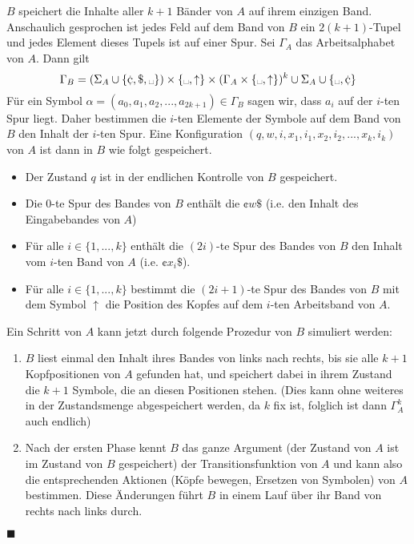         $B$ speichert die Inhalte aller $k+1$ Bänder von $A$ auf ihrem einzigen Band. Anschaulich gesprochen ist jedes Feld auf dem Band von $B$ ein $2(k+1)$-Tupel und jedes Element dieses Tupels ist auf einer Spur. 
        Sei $\Gamma_A$ das Arbeitsalphabet von $A$. Dann gilt 
        $$\Gamma_B = (\Sigma_A \cup \{\cent, \$, \text{\textvisiblespace}\}) \times \{\text{\textvisiblespace},\uparrow\} \times (\Gamma_A \times \{\text{\textvisiblespace}, \uparrow\})^k \cup \Sigma_A \cup \{\text{\textvisiblespace}, \cent\}$$
        Für ein Symbol $\alpha = (a_0,a_1,a_2,...,a_{2k+1}) \in \Gamma_B$ sagen wir, dass $a_i$ auf der $i$-ten Spur liegt. Daher bestimmen die $i$-ten Elemente der Symbole auf dem Band von $B$ den Inhalt der $i$-ten Spur. Eine Konfiguration $(q,w,i,x_1,i_1,x_2,i_2,...,x_k,i_k)$ von $A$ ist dann in $B$ wie folgt gespeichert. 
        \begin{itemize}
            \item Der Zustand $q$ ist in der endlichen Kontrolle von $B$ gespeichert. 
            \item Die $0$-te Spur des Bandes von $B$ enthält die $\cent w\$$ (i.e. den Inhalt des Eingabebandes von $A$)
            \item Für alle $i \in \{1, ..., k\}$ enthält die $(2i)$-te Spur des Bandes von $B$ den Inhalt vom $i$-ten Band von $A$ (i.e. $\cent x_i\$$).
            \item Für alle $i \in \{1, ..., k\}$ bestimmt die $(2i +1)$-te Spur des Bandes von $B$ mit dem Symbol $\uparrow$ die Position des Kopfes auf dem $i$-ten Arbeitsband von $A$.
        \end{itemize}
        Ein Schritt von $A$ kann jetzt durch folgende Prozedur von $B$ simuliert werden:
        \begin{enumerate}
            \item $B$ liest einmal den Inhalt ihres Bandes von links nach rechts, bis sie alle $k+1$ Kopfpositionen von $A$ gefunden hat, und speichert dabei in ihrem Zustand die $k+1$ Symbole, die an diesen Positionen stehen. (Dies kann ohne weiteres in der Zustandsmenge abgespeichert werden, da $k$ fix ist, folglich ist dann $\Gamma_A^k$ auch endlich)
            \item Nach der ersten Phase kennt $B$ das ganze Argument (der Zustand von $A$ ist im Zustand von $B$ gespeichert) der Transitionsfunktion von $A$ und kann also die entsprechenden Aktionen (Köpfe bewegen, Ersetzen von Symbolen) von $A$ bestimmen. Diese Änderungen führt $B$ in einem Lauf über ihr Band von rechts nach links durch.
        \end{enumerate}
        \hspace*{0pt}\hfill$\blacksquare$
    
